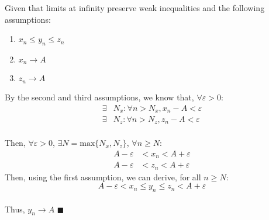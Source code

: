 \documentclass{article}
\begin{document}
Given that limits at infinity preserve weak inequalities and the following assumptions:
\begin{enumerate}
	\item $x_n\leq y_n\leq z_n$ 
	\item  $x_n\rightarrow A$ 
	\item  $z_n\rightarrow A$
\end{enumerate}
By the second and third assumptions, we know that, $\forall\varepsilon>0$:
\begin{align*}
	\exists &N_x:\forall n>N_x, x_n-A<\varepsilon \\
	\exists &N_z:\forall n>N_z, z_n-A<\varepsilon
\end{align*}
\medskip \\
Then, $\forall\varepsilon>0$, $\exists N=\text{max}\{N_x,N_z\}$, $\forall n\geq N$:
\begin{equation*}
	\begin{split}
		A-\varepsilon&<x_n<A+\varepsilon \\
		A-\varepsilon&<z_n<A+\varepsilon 
	\end{split}
\end{equation*}
Then, using the first assumption, we can derive, for all $n\geq N$:
\begin{equation*}
	A-\varepsilon<x_n\leq y_n\leq z_n<A+\varepsilon
\end{equation*}
\bigskip \\
Thus, $y_n\rightarrow A$ $\blacksquare$

\end{document}
